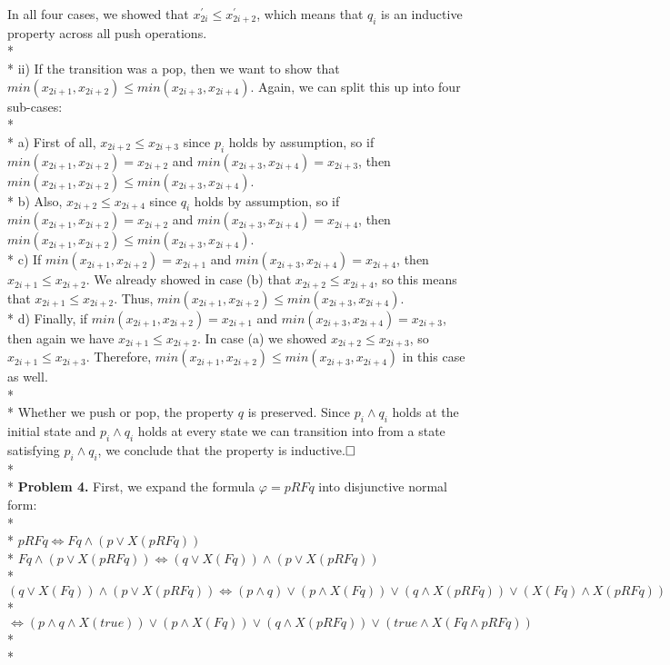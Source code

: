 \documentclass[12pt]{article}
\begin{document}
In all four cases, we showed that $x^\prime_{2i}\leq x^\prime_{2i+2}$, which means that $q_i$ is an inductive property across all push operations.\\*\\*
ii) If the transition was a pop, then we want to show that $min(x_{2i+1},x_{2i+2})\leq min(x_{2i+3},x_{2i+4})$. Again, we can split this up into four sub-cases:\\*\\*
a) First of all, $x_{2i+2}\leq x_{2i+3}$ since $p_i$ holds by assumption, so if $min(x_{2i+1},x_{2i+2})=x_{2i+2}$ and $min(x_{2i+3},x_{2i+4})=x_{2i+3}$, then $min(x_{2i+1},x_{2i+2})\leq min(x_{2i+3},x_{2i+4})$.\\*
b) Also, $x_{2i+2}\leq x_{2i+4}$ since $q_i$ holds by assumption, so if $min(x_{2i+1},x_{2i+2})=x_{2i+2}$ and $min(x_{2i+3},x_{2i+4})=x_{2i+4}$, then $min(x_{2i+1},x_{2i+2})\leq min(x_{2i+3},x_{2i+4})$.\\*
c) If $min(x_{2i+1},x_{2i+2})=x_{2i+1}$ and $min(x_{2i+3},x_{2i+4})=x_{2i+4}$, then $x_{2i+1}\leq x_{2i+2}$. We already showed in case (b) that $x_{2i+2}\leq x_{2i+4}$, so this means that $x_{2i+1}\leq x_{2i+2}$. Thus, $min(x_{2i+1},x_{2i+2})\leq min(x_{2i+3},x_{2i+4})$.\\*
d) Finally, if $min(x_{2i+1},x_{2i+2})=x_{2i+1}$ and $min(x_{2i+3},x_{2i+4})=x_{2i+3}$, then again we have $x_{2i+1}\leq x_{2i+2}$. In case (a) we showed $x_{2i+2}\leq x_{2i+3}$, so $x_{2i+1}\leq x_{2i+3}$. Therefore, $min(x_{2i+1},x_{2i+2})\leq min(x_{2i+3},x_{2i+4})$ in this case as well.\\*\\*
Whether we push or pop, the property $q$ is preserved. Since $p_i\wedge q_i$ holds at the initial state and $p_i\wedge q_i$ holds at every state we can transition into from a state satisfying $p_i\wedge q_i$, we conclude that the property is inductive.$\hfill\Box$\\*\\*
\textbf{Problem 4.} First, we expand the formula $\varphi=pRFq$ into disjunctive normal form:\\*\\*
$pRFq\Longleftrightarrow Fq\wedge(p\vee X(pRFq))$\\*
$Fq\wedge(p\vee X(pRFq))\Longleftrightarrow(q\vee X(Fq))\wedge(p\vee X(pRFq))$\\*
$(q\vee X(Fq))\wedge(p\vee X(pRFq))\Longleftrightarrow(p\wedge q)\vee(p\wedge X(Fq))\vee(q\wedge X(pRFq))\vee(X(Fq)\wedge X(pRFq))$\\*
$\Longleftrightarrow(p\wedge q\wedge X(true))\vee(p\wedge X(Fq))\vee(q\wedge X(pRFq))\vee(true\wedge X(Fq\wedge pRFq))$\\*\\*
\end{document}
